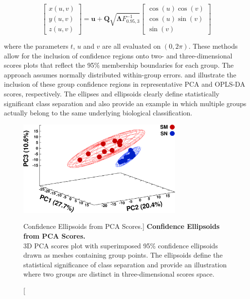 \begin{equation}
\begin{bmatrix}
x(u,v) \\
y(u,v) \\
z(u,v)
\end{bmatrix}
 = \mathbf{u} + \mathbf{Q} \sqrt{\mathbf{\Lambda} F_{0.95,3}^{-1}}
\begin{bmatrix}
\cos(u) \cos(v) \\
\cos(u) \sin(v) \\
\sin(v)
\end{bmatrix}
\end{equation}

\begin{doublespace}
where the parameters $t$, $u$ and $v$ are all evaluated on $(0,2\pi)$. These
methods allow for the inclusion of confidence regions onto two- and
three-dimensional scores plots that reflect the 95\% membership boundaries
for each group. The approach assumes normally distributed within-group errors.
 and  illustrate the inclusion
of these group confidence regions in representative PCA and OPLS-DA scores,
respectively. The ellipses and ellipsoids clearly define statistically
significant class separation and also provide an example in which multiple
groups actually belong to the same underlying biological classification.
\end{doublespace}

\begin{figure}
\includegraphics[width=3.25in]{figs/utils/02-pca.png}
\caption
      [Confidence Ellipsoids from PCA Scores.]{
  {\bf Confidence Ellipsoids from PCA Scores.}
  \\
  3D PCA scores plot with superimposed 95\% confidence ellipsoids drawn as
  meshes containing group points. The ellipsoids define the statistical
  significance of class separation and provide an illustration where two
  groups are distinct in three-dimensional scores space.
}
\label{figure.10.2}
\end{figure}

